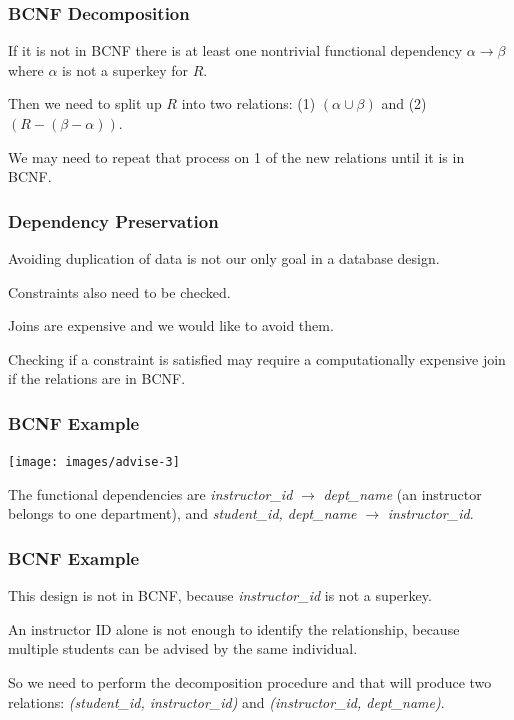 \begin{frame}
\frametitle{BCNF Decomposition}

If it is not in BCNF there is at least one nontrivial functional dependency $\alpha \rightarrow \beta$ where $\alpha$ is not a superkey for $R$. 

Then we need to split up $R$ into two relations: (1) $(\alpha \cup \beta)$ and (2) $(R - (\beta - \alpha))$. 


We may need to repeat that process on 1 of the new relations until it is in BCNF.


\end{frame}



\begin{frame}
\frametitle{Dependency Preservation}

 Avoiding duplication of data is not our only goal in a database design. 
 
 Constraints also need to be checked. 
 
Joins are expensive and we would like to avoid them. 
 
 Checking if a constraint is satisfied may require a computationally expensive join if the relations are in BCNF.


\end{frame}



\begin{frame}
\frametitle{BCNF Example}

\begin{center}
\texttt{[image: images/advise-3]}
\end{center}

The functional dependencies are \textit{instructor\_id} $\rightarrow$ \textit{dept\_name} (an instructor belongs to one department), and \textit{student\_id, dept\_name} $\rightarrow$ \textit{instructor\_id}.


\end{frame}



\begin{frame}
\frametitle{BCNF Example}

This design is not in BCNF, because \textit{instructor\_id} is not a superkey.

An instructor ID alone is not enough to identify the relationship, because multiple students can be advised by the same individual. 

So we need to perform the decomposition procedure and that will produce two relations: \textit{(student\_id, instructor\_id)} and \textit{(instructor\_id, dept\_name)}.

\end{frame}



